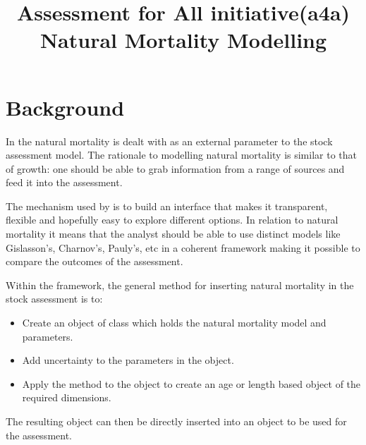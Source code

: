 \documentclass[a4paper,english,10pt]{article}\usepackage[]{graphicx}\usepackage[]{color}
\begin{document}
\title{Assessment for All initiative(a4a) \\ Natural Mortality Modelling}



\maketitle


\newpage
\tableofcontents
\newpage



\section{Background}

In the \aFa natural mortality is dealt with as an external parameter to the stock assessment model. The rationale to modelling natural mortality is similar to that of growth: one should be able to grab information from a range of sources and feed it into the assessment.

The mechanism used by \aFa is to build an interface that makes it transparent, flexible and hopefully easy to explore different options. In relation to natural mortality it means that the analyst should be able to use distinct models like Gislasson's, Charnov's, Pauly's, etc in a coherent framework making it possible to compare the outcomes of the assessment. 

Within the \aFa framework, the general method for inserting natural mortality in the stock assessment is to:

\begin{itemize}
    \item Create an object of class  which holds the natural mortality model and parameters.
    \item Add uncertainty to the parameters in the  object.
    \item Apply the  method to the  object to create an age or length based  object of the required dimensions.
\end{itemize}

The resulting  object can then be directly inserted into an  object to be used for the assessment.   
\end{document}
